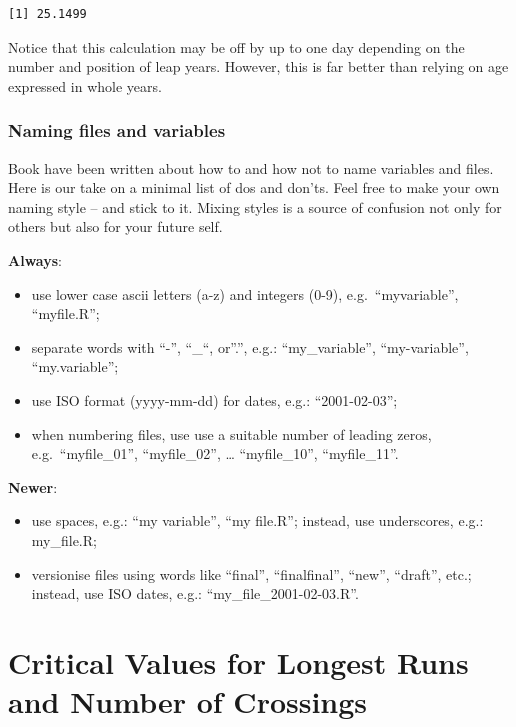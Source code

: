 \documentclass[
]{book}
\begin{document}
\begin{verbatim}
[1] 25.1499
\end{verbatim}

Notice that this calculation may be off by up to one day depending on
the number and position of leap years. However, this is far better than
relying on age expressed in whole years.

\subsection{Naming files and
variables}\label{naming-files-and-variables}

Book have been written about how to and how not to name variables and
files. Here is our take on a minimal list of dos and don'ts. Feel free
to make your own naming style -- and stick to it. Mixing styles is a
source of confusion not only for others but also for your future self.

\textbf{Always}:

\begin{itemize}
\item
  use lower case ascii letters (a-z) and integers (0-9),
  e.g.~``myvariable'', ``myfile.R'';
\item
  separate words with ``-'', ``\_``, or''.'', e.g.: ``my\_variable'',
  ``my-variable'', ``my.variable'';
\item
  use ISO format (yyyy-mm-dd) for dates, e.g.: ``2001-02-03'';
\item
  when numbering files, use use a suitable number of leading zeros,
  e.g.~``myfile\_01'', ``myfile\_02'', \ldots{} ``myfile\_10'',
  ``myfile\_11''.
\end{itemize}

\textbf{Newer}:

\begin{itemize}
\item
  use spaces, e.g.: ``my variable'', ``my file.R''; instead, use
  underscores, e.g.: my\_file.R;
\item
  versionise files using words like ``final'', ``finalfinal'', ``new'',
  ``draft'', etc.; instead, use ISO dates, e.g.:
  ``my\_file\_2001-02-03.R''.
\end{itemize}

\chapter{Critical Values for Longest Runs and Number of
Crossings}\label{runs-limits}
\end{document}
